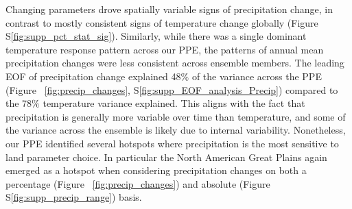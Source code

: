 \documentclass[draft]{agujournal2019}
\begin{document}
Changing parameters drove spatially variable signs of precipitation change, in contrast to mostly consistent signs of temperature change globally (Figure S\ref{fig:supp_pct_stat_sig}). Similarly, while there was a single dominant temperature response pattern across our PPE, the patterns of annual mean precipitation changes were less consistent across ensemble members. The leading EOF of precipitation change explained 48$\%$ of the variance across the PPE (Figure ~\ref{fig:precip_changes}, S\ref{fig:supp_EOF_analysis_Precip}) compared to the 78$\%$ temperature variance explained. This aligns with the fact that precipitation is generally more variable over time than temperature, and some of the variance across the ensemble is likely due to internal variability. Nonetheless, our PPE identified several hotspots where precipitation is the most sensitive to land parameter choice. In particular the North American Great Plains again emerged as a hotspot when considering precipitation changes on both a percentage (Figure ~\ref{fig:precip_changes}) and absolute (Figure S\ref{fig:supp_precip_range}) basis.
\end{document}
